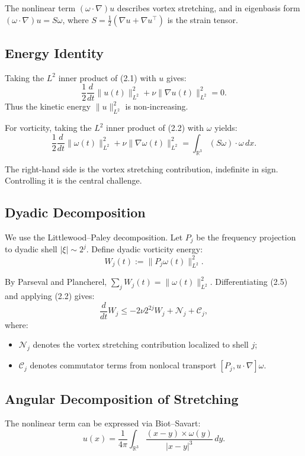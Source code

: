 \documentclass[11pt]{article}
\begin{document}
The nonlinear term $(\omega \cdot \nabla) u$ describes vortex stretching, and in eigenbasis form $(\omega \cdot \nabla) u = S \omega$, where $S = \frac{1}{2}(\nabla u + \nabla u^\top)$ is the strain tensor.

\subsection{Energy Identity}

Taking the $L^2$ inner product of (2.1) with $u$ gives:
\[
\frac{1}{2} \frac{d}{dt} \|u(t)\|_{L^2}^2 + \nu \|\nabla u(t)\|_{L^2}^2 = 0. \tag{2.3}
\]
Thus the kinetic energy $\|u\|_{L^2}^2$ is non-increasing.  

For vorticity, taking the $L^2$ inner product of (2.2) with $\omega$ yields:
\[
\frac{1}{2} \frac{d}{dt} \|\omega(t)\|_{L^2}^2 + \nu \|\nabla \omega(t)\|_{L^2}^2 
= \int_{\mathbb{R}^3} (S\omega) \cdot \omega \, dx. \tag{2.4}
\]

The right-hand side is the vortex stretching contribution, indefinite in sign. Controlling it is the central challenge.

\subsection{Dyadic Decomposition}

We use the Littlewood--Paley decomposition. Let $P_j$ be the frequency projection to dyadic shell $|\xi| \sim 2^j$. Define dyadic vorticity energy:
\[
W_j(t) := \|P_j \omega(t)\|_{L^2}^2. \tag{2.5}
\]

By Parseval and Plancherel, $\sum_{j} W_j(t) = \|\omega(t)\|_{L^2}^2$. Differentiating (2.5) and applying (2.2) gives:
\[
\frac{d}{dt} W_j \leq - 2 \nu 2^{2j} W_j + \mathcal{N}_j + \mathcal{C}_j, \tag{2.6}
\]
where:
\begin{itemize}
\item $\mathcal{N}_j$ denotes the vortex stretching contribution localized to shell $j$;
\item $\mathcal{C}_j$ denotes commutator terms from nonlocal transport $[P_j, u \cdot \nabla]\omega$.
\end{itemize}

\subsection{Angular Decomposition of Stretching}

The nonlinear term can be expressed via Biot--Savart:
\[
u(x) = \frac{1}{4\pi} \int_{\mathbb{R}^3} \frac{(x-y)\times \omega(y)}{|x-y|^3}\, dy. \tag{2.7}
\]
\end{document}
